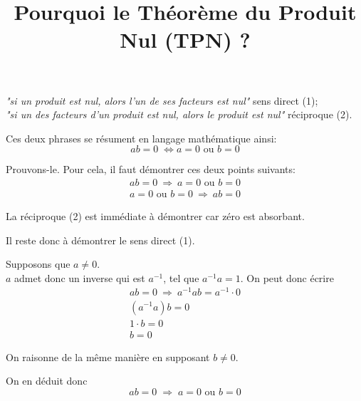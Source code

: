 \documentclass[12pt]{article}
\title{Pourquoi le Théorème du Produit Nul (TPN) ?}
\begin{document}
\maketitle

\textit{"si un produit est nul, alors l’un de ses facteurs est nul"} sens direct (1); \\
\textit{"si un des facteurs d’un produit est nul, alors le produit est nul"} réciproque (2).

Ces deux phrases se résument en langage mathématique ainsi:
\[
ab = 0 \;\iff a=0 \text{ ou } b=0
\]

Prouvons-le. Pour cela, il faut démontrer ces deux points suivants:
\begin{gather}   
    ab = 0 \ \Rightarrow \ a=0 \text{ ou } b=0 \\
    a=0 \text{ ou } b=0 \ \Rightarrow \ ab = 0
\end{gather}

La réciproque (2) est immédiate à démontrer car zéro est absorbant. 

Il reste donc à démontrer le sens direct (1).

Supposons que $a \neq 0$. \\
$a$ admet donc un inverse qui est $a^{-1}$, tel que $a^{-1}a = 1$. On peut donc écrire
\begin{gather*}
    ab = 0 \ \Rightarrow \ a^{-1}ab = a^{-1}\cdot0 \\
    (a^{-1}a)b = 0 \\
    1 \cdot b = 0 \\
    b = 0
\end{gather*}

On  raisonne de la même manière en supposant $b \neq 0$.

On en déduit donc
\[
ab = 0 \;\Rightarrow\; a=0 \text{ ou } b=0
\]
\end{document}

